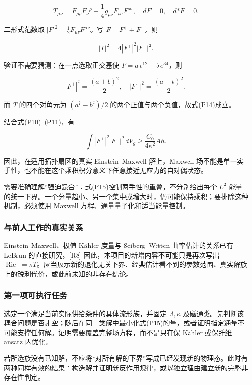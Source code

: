 \documentclass[UTF8,a4paper,11pt,fontset=fandol]{ctexart}
\begin{document}
\[
T_{\mu\nu}=F_{\mu\rho}F_\nu{}^\rho
-\frac14g_{\mu\nu}F_{\rho\sigma}F^{\rho\sigma},
\quad dF=0,\quad d{*F}=0.
\tag{P13}
\]

二形式范数取 \(|F|^2=\tfrac12F_{\mu\nu}F^{\mu\nu}\)。写
\(F=F^++F^-\)，则

\[
\boxed{|T|^2=4|F^+|^2|F^-|^2.}
\tag{P14}
\]

验证不需要猜测：在一点选取正交基使 \(F=a\,e^{12}+b\,e^{34}\)，则

\[
|F^+|^2=\frac{(a+b)^2}{2},\quad
|F^-|^2=\frac{(a-b)^2}{2},
\]

而 \(T\) 的四个对角元为 \((a^2-b^2)/2\)
的两个正值与两个负值，故式(P14)成立。

结合式(P10)--(P11)，有

\[
\boxed{
\int|F^+|^2|F^-|^2\,dV_g
\ge\frac{C_0}{4\kappa^2}Ah.
}
\tag{P15}
\]

因此，在适用拓扑扇区的真实 Einstein--Maxwell 解上，Maxwell
场不能是单一实手性，也不能在这个乘积积分意义下任意接近无应力的自对偶状态。

需要准确理解``强迫混合''：式(P15)控制两手性的重叠，不分别给出每个
\(L^2\)
能量的统一下界。一个分量趋小、另一个集中或增大时，仍可能保持乘积；要排除这种机制，必须使用
Maxwell 方程、通量量子化和适当能量控制。

\subsubsection{与前人工作的真实关系}\label{ux4e0eux524dux4ebaux5de5ux4f5cux7684ux771fux5b9eux5173ux7cfb}

Einstein--Maxwell、极值 Kähler 度量与 Seiberg--Witten 曲率估计的关系已有
LeBrun 的直接研究。{[}R8{]} 因此，本项目的新增内容不可能只是再次写出
\(\operatorname{Ric}^{\circ}=\kappa T\)。应当展示新的退化无关下界、经典估计看不到的参数范围、真实解族上的锐利代价，或此前未知的非存在结论。

\subsubsection{第一项可执行任务}\label{ux7b2cux4e00ux9879ux53efux6267ux884cux4efbux52a1}

选定一个满足当前实际供给条件的具体流形族，并固定 \(\Lambda,\kappa\)
及磁通类。先判断该耦合问题是否非空；随后在同一类解中最小化式(P15)的量，或者证明指定通量不可能支撑任何解。证明需要覆盖完整场方程，而不是只在保
Kähler 或保纤维 ansatz 内优化。

若所选族没有已知解，不应将``对所有解的下界''写成已经发现新的物理态。此时有两种同样有效的结果：构造解并证明新反作用规律，或以独立理由建立新的完整非存在性判定。
\end{document}
